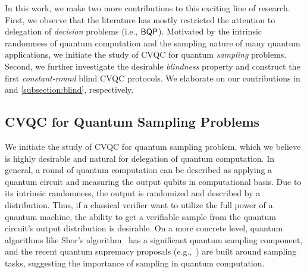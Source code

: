 %

In this work, we make two more contributions to this exciting line of research. First, we observe that the literature has mostly restricted the attention to delegation of \emph{decision} problems (i.e., $\operatorname{\mathsf{BQP}}$). Motivated by the intrinsic randomness of quantum computation and the sampling nature of many quantum applications, we initiate the study of CVQC for quantum \emph{sampling} problems. Second, we further investigate the desirable \emph{blindness} property and construct the first \emph{constant-round} blind CVQC protocols. We elaborate on our contributions in  and \ref{subsection:blind}, respectively.





\subsection{CVQC for Quantum Sampling Problems} \label{subsection:sampling}

We initiate the study of CVQC for quantum sampling problem, which we believe is highly desirable and natural for delegation of quantum computation. In general, a round of quantum computation can be described as applying a quantum circuit and measuring the output qubits in computational basis. Due to its intrinsic randomness, the output is randomized and described by a distribution. 
Thus, if a classical verifier want to utilize the full power of a quantum machine, the ability to get a verifiable sample from the quantum circuit's output distribution is desirable.  On a more concrete level, quantum algorithms like Shor's algorithm~\cite{Shor} has a significant quantum sampling component, and the recent quantum supremacy proposals (e.g.,~\cite{Boson, IQP, nature-google}) are built around sampling tasks, suggesting the importance of sampling in quantum computation.




